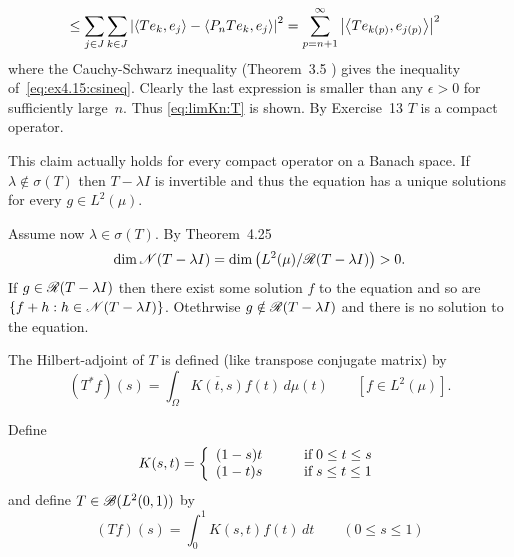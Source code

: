 \begin{enumerate}
\begin{itemize}
\begin{align}
\iffalse
&\leq \sum_{j\in J} \sum_{k\in J} 
 \left|
  \lrbangle{Te_k,ej} 
  - \lrbangle{TP_ne_k,e_j} - \lrbangle{P_nTe_k,e_j} + \lrbangle{P_nTP_ne_k,e_j}
 \right|^2 \notag
\fi
&\leq \sum_{j\in J} \sum_{k\in J} 
 \left|  \lrbangle{Te_k,e_j} - \lrbangle{P_nTe_k,e_j} \right|^2 \notag
= \sum_{p=n+1}^\infty
 \left|  \lrbangle{Te_{k(p)},e_{j(p)}} \right|^2 \notag
\end{align}
where the Cauchy-Schwarz inequality (Theorem~3.5 \cite{RudinRCA80})
gives the inequality of~\eqref{eq:ex4.15:csineq}.
Clearly the last expression is smaller than any \(\epsilon>0\)
for sufficiently large~$n$.
Thus \eqref{eq:limKn:T} is shown.
By Exercise~13 $T$ is a compact operator.

This claim actually holds for every compact operator on a Banach space.
If \(\lambda \notin \sigma(T)\) then \(T -\lambda I\) is invertible
and thus the equation has a unique solutions for every \(g\in L^2(\mu)\).

Assume now \(\lambda \in \sigma(T)\). By Theorem~4.25
\begin{equation*}
\dim \mathscr{N}(T-\lambda I) = \dim\left(L^2(\mu)/\mathscr{R}(T-\lambda I)\right) > 0.
\end{equation*}
If \(g \in \mathscr{R}(T-\lambda I)\) then 
there exist some solution $f$ to the equation and
so are \(\{f+h: h \in \mathscr{N}(T-\lambda I)\}\).
Otethrwise  \(g \notin \mathscr{R}(T-\lambda I)\) 
and there is no solution to the equation.

The Hilbert-adjoint of $T$ is defined (like transpose conjugate matrix) by
\begin{equation*}
(T^*f)(s) = \int_\Omega \overline{K(t,s)}f(t)\,d\mu(t) \qquad [f \in L^2(\mu)].
\end{equation*}

\end{itemize}


\begin{excopy}
Define 
\begin{equation*}
K(s,t) = 
\left\{
\begin{array}{ll}
(1-s)t \qquad & \textnormal{if}\; 0 \leq t \leq s \\
(1-t)s \qquad & \textnormal{if}\; s \leq t \leq 1
\end{array}
\right.
\end{equation*}
and define \(T \in \mathscr{B}(L^2(0,1))\) by
\begin{equation*}
(Tf)(s) = \int_0^1 K(s,t)f(t)\,dt \qquad (0 \leq s \leq 1)
\end{equation*}
\begin{itemize}


\end{itemize}
\end{excopy}
\end{enumerate}
